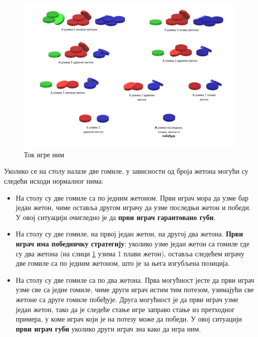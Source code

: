 \documentclass[a4paper]{article}
\begin{document}
\begin{figure}[H]
	\begin{center}
		\includegraphics[width=\textwidth]{NimPrimer.png}
	\end{center}
	\caption{Ток игре ним}
	\label{fig:nimPrimer}
\end{figure}

Уколико се на столу налазе две гомиле, у зависности од броја жетона могући су следећи исходи нормалног нима:

\begin{itemize}
	\item На столу су две гомиле са по једним жетоном. Први играч мора да узме бар један жетон, чиме оставља другом играчу да узме последњи жетон и победи. У овој ситуацији очигледно је да \textbf{први играч гарантовано губи}.
	
	\item На столу су две гомиле, на првој један жетон, на другој два жетона. \textbf{Први играч има победничку стратегију}: уколико узме један жетон са гомиле где су два жетона (на слици \ref{fig:nimPrimer} узима 1 плави жетон), оставља следећем играчу две гомиле са по једним жетоном, што је за њега изгубљена позиција.
	
	\item На столу су две гомиле са по два жетона. Прва могућност јесте да први играч узме све са једне гомиле, чиме други играч истим тим потезом, узимајући све жетоне са друге гомиле побеђује. Друга могућност је да први играч узме један жетон, тако да је следеће стање игре заправо стање из претходног примера, у коме играч који је на потезу може да победи. У овој ситуацији \textbf{први играч губи} уколико други играч зна како да игра ним.
\end{itemize}
\end{document}
